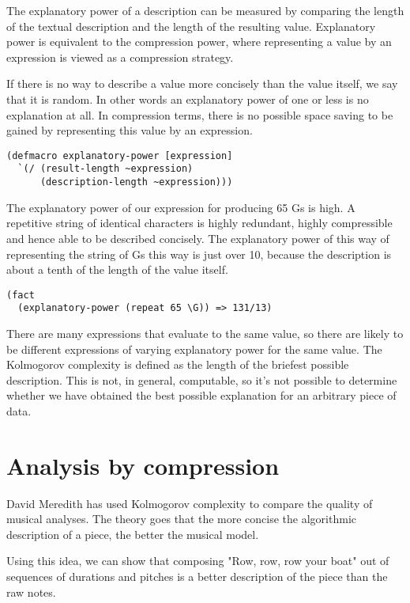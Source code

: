 \documentclass[numbers]{sigplanconf}
\begin{document}
The explanatory power of a description can be measured by comparing the length of the textual description and the length
of the resulting value. Explanatory power is equivalent to the compression power, where representing a value by an
expression is viewed as a compression strategy.

If there is no way to describe a value more concisely than the value itself, we say that it is random. In other words an
explanatory power of one or less is no explanation at all. In compression terms, there is no possible space saving
to be gained by representing this value by an expression.

\begin{verbatim}
(defmacro explanatory-power [expression]
  `(/ (result-length ~expression)
      (description-length ~expression)))
\end{verbatim}

The explanatory power of our expression for producing 65 Gs is high. A repetitive string of identical characters is
highly redundant, highly compressible and hence able to be described concisely. The explanatory power of this way of
representing the string of Gs this way is just over 10, because the description is about a tenth of the length of the
value itself.

\begin{verbatim}
(fact
  (explanatory-power (repeat 65 \G)) => 131/13)
\end{verbatim}

There are many expressions that evaluate to the same value, so there are likely to be different expressions of varying
explanatory power for the same value. The Kolmogorov complexity is defined as the length of the briefest possible description.
This is not, in general, computable, so it's not possible to determine whether we have obtained the best possible explanation
for an arbitrary piece of data.

\section{Analysis by compression}

David Meredith has used Kolmogorov complexity to compare the quality of musical analyses. The theory goes that the
more concise the algorithmic description of a piece, the better the musical model.

Using this idea, we can show that composing "Row, row, row your boat" out of sequences of durations and pitches
is a better description of the piece than the raw notes.
\end{document}
